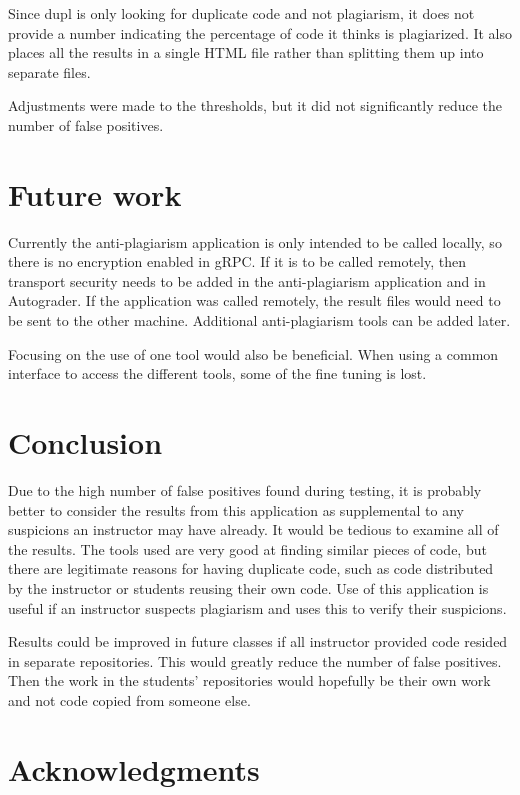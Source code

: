 \documentclass[10pt,journal,compsoc]{IEEEtran}
\begin{document}
	Since dupl is only looking for duplicate code and not plagiarism, it does not provide a number indicating the percentage of code it thinks is plagiarized. It also places all the results in a single HTML file rather than splitting them up into separate files.
	
	Adjustments were made to the thresholds, but it did not significantly reduce the number of false positives.
	
	\section{Future work}
	Currently the anti-plagiarism application is only intended to be called locally, so there is no encryption enabled in gRPC. If it is to be called remotely, then transport security needs to be added in the anti-plagiarism application and in Autograder. If the application was called remotely, the result files would need to be sent to the other machine. Additional anti-plagiarism tools can be added later.
	
	Focusing on the use of one tool would also be beneficial. When using a common interface to access the different tools, some of the fine tuning is lost.
	
	\section{Conclusion}
	Due to the high number of false positives found during testing, it is probably better to consider the results from this application as supplemental to any suspicions an instructor may have already. It would be tedious to examine all of the results. The tools used are very good at finding similar pieces of code, but there are legitimate reasons for having duplicate code, such as code distributed by the instructor or students reusing their own code. Use of this application is useful if an instructor suspects plagiarism and uses this to verify their suspicions.
	
	Results could be improved in future classes if all instructor provided code resided in separate repositories. This would greatly reduce the number of false positives. Then the work in the students' repositories would hopefully be their own work and not code copied from someone else.
	
	\ifCLASSOPTIONcompsoc
		\section*{Acknowledgments}
	\else
\end{document}
